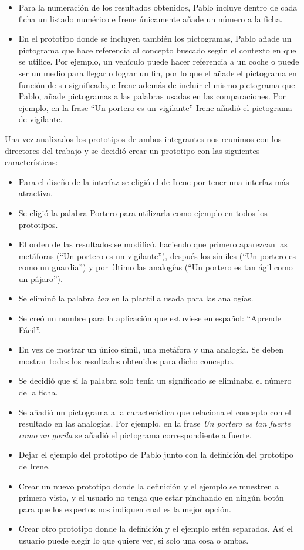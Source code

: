 \begin{itemize}
	\item Para la numeración de los resultados obtenidos, Pablo incluye dentro de cada ficha un listado numérico e Irene únicamente añade un número a la ficha.
	
	\item En el prototipo donde se incluyen también los pictogramas, Pablo añade un pictograma que hace referencia al concepto buscado según el contexto en que se utilice. Por ejemplo, un vehículo puede hacer referencia a un coche o puede ser un medio para llegar o lograr un fin, por lo que el añade el pictograma en función de su significado, e Irene además de incluir el mismo pictograma que Pablo, añade pictogramas a las palabras usadas en las comparaciones. Por ejemplo, en la frase ``Un portero es un vigilante'' Irene añadió el pictograma de vigilante.
\end{itemize}




Una vez analizados los prototipos de ambos integrantes nos reunimos con los directores del trabajo y se decidió crear un prototipo con las siguientes características:


\begin{itemize}
	\item Para el diseño de la interfaz se eligió el de Irene por tener una interfaz más atractiva.
	\item Se eligió la palabra Portero para utilizarla como ejemplo en todos los prototipos.
	\item El orden de las resultados se modificó, haciendo que primero aparezcan las metáforas (``Un portero es un vigilante''), después los símiles (``Un portero es como un guardia'') y por último las analogías  (``Un portero es tan ágil como un pájaro'').
	\item Se eliminó la palabra \textit{tan} en la plantilla usada para las analogías.
	\item Se creó un nombre para la aplicación que estuviese en español: ``Aprende Fácil''.
	\item En vez de mostrar un único símil, una metáfora y una analogía. Se deben mostrar todos los resultados obtenidos para dicho concepto.
	\item Se decidió que si la palabra solo tenía un significado se eliminaba el número de la ficha.
	\item Se añadió un pictograma a la característica que relaciona el concepto con el resultado en las analogías. Por ejemplo, en la frase \textit{Un portero es tan fuerte como un gorila}  se añadió el pictograma correspondiente a fuerte.
	\item Dejar el ejemplo del prototipo de Pablo junto con la definición del prototipo de Irene.
	\item Crear un nuevo prototipo donde la definición y el ejemplo se muestren a primera vista, y el usuario no tenga que estar pinchando en ningún botón para que los expertos nos indiquen cual es la mejor opción.
	\item Crear otro prototipo donde la definición y el ejemplo estén separados. Así el usuario puede elegir lo que quiere ver, si solo una cosa o ambas.
\end{itemize} 


